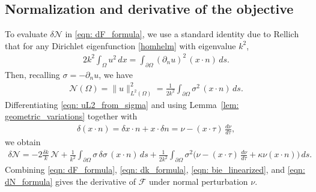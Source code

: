 \documentclass{amsart}
\theoremstyle{plain}
\begin{document}
\subsection{Normalization and derivative of the objective}
To evaluate $\delta\mathcal{N}$ in \eqref{eqn: dF_formula}, we use
a standard identity due to Rellich \cite{rellich} that
for any Dirichlet eigenfunction \eqref{homhelm} with eigenvalue $k^2$,
  \begin{align}\label{eqn: rellich_identity}
    2k^2\int_\Omega u^2\,dx
    = \int_{\partial \Omega} (\partial_n u)^2\,(x\cdot n)\,ds.
  \end{align}
Then, recalling $\sigma = -\partial_n u$, we have
  \begin{align}\label{eqn: uL2_from_sigma}
    \mathcal{N}(\Omega)=\|u\|_{L^2(\Omega)}^2
    = \frac{1}{2k^2}\int_{\partial \Omega} \sigma^2\,(x\cdot n)\,ds.
  \end{align}
Differentiating \eqref{eqn: uL2_from_sigma} and using Lemma~\ref{lem: geometric_variations} together with
  \begin{align}
    \delta(x\cdot n) = \delta x\cdot n + x\cdot\delta n = \nu - (x\cdot \tau)\,\frac{d\nu}{d\tau},
  \end{align}
we obtain
  \begin{align}\label{eqn: dN_formula}
    \delta\mathcal{N}
    = -2\frac{\delta k}{k}\,\mathcal{N}
      + \frac{1}{k^2}\int_{\partial \Omega} \sigma\,\delta\sigma\,(x\cdot n)\,ds
      + \frac{1}{2k^2}\int_{\partial \Omega} \sigma^2\Big(\nu - (x\cdot \tau)\,\frac{d\nu}{d\tau} + \kappa \nu(x\cdot n)\Big)\,ds.
  \end{align}
Combining \eqref{eqn: dF_formula}, \eqref{eqn: dk_formula}, \eqref{eqn: bie_linearized}, and \eqref{eqn: dN_formula} gives the derivative of $\mathcal{F}$ under normal perturbation $\nu$.
\end{document}
